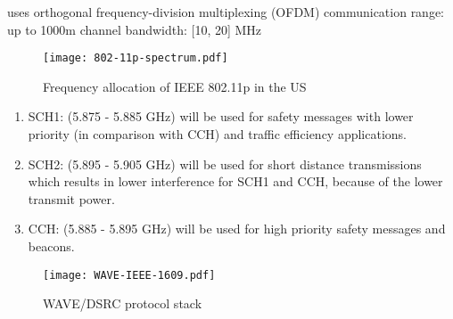 uses orthogonal frequency-division multiplexing (OFDM)
communication range: up to 1000m
channel bandwidth: [10, 20] MHz

\begin{figure}[H]
    \centering
    \texttt{[image: 802-11p-spectrum.pdf]}
    \caption{Frequency allocation of IEEE 802.11p in the US}
    \label{fig:802-11p-spectrum}
\end{figure}

\begin{enumerate}
    \item SCH1: (5.875 - 5.885 GHz) will be used for safety messages with lower priority (in comparison with CCH) and traffic efficiency applications.
    \item SCH2: (5.895 - 5.905 GHz) will be used for short distance transmissions which results in lower interference for SCH1 and CCH, because of the lower transmit power.
    \item CCH: (5.885 - 5.895 GHz) will be used for high priority safety messages and beacons.
\end{enumerate}

\begin{figure}[H]
    \centering
    \texttt{[image: WAVE-IEEE-1609.pdf]}
    \caption{WAVE/DSRC protocol stack}
    \label{fig:iso-ieee-wave}
\end{figure}






